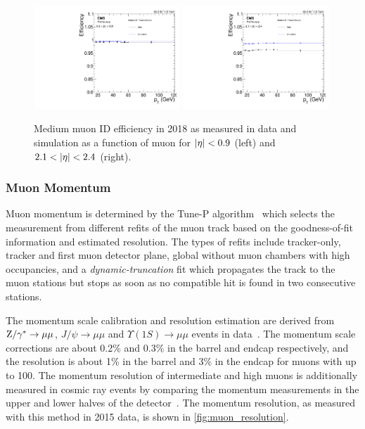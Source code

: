 \begin{figure}
    \includegraphics[width=0.49\textwidth]{Figures/Detector/CMS/muon_id_low_eta.pdf}
    \includegraphics[width=0.49\textwidth]{Figures/Detector/CMS/muon_id_high_eta.pdf}
    \caption[Medium Muon ID Efficiency in 2018]{Medium muon ID efficiency in 2018 as measured in data and simulation as a function of muon \pt for $\lvert \eta \rvert < 0.9$ (left) and $2.1 < \lvert \eta \rvert < 2.4$ (right).}\label{fig:muon_id_performance}
  \end{figure}

\subsubsection{Muon Momentum}

Muon momentum is determined by the Tune-P algorithm~\cite{CMS:2012nsv} which selects the \pt measurement from different refits of the muon track based on the goodness-of-fit information and estimated \pt resolution. The types of refits include tracker-only, tracker and first muon detector plane, global without muon chambers with high occupancies, and a \textit{dynamic-truncation} fit which propagates the track to the muon stations but stops as soon as no compatible hit is found in two consecutive stations.

The momentum scale calibration and resolution estimation are derived from $\mathrm{Z}/\gamma^*\to\mu\mu$, $J/\psi\to\mu\mu$ and $\Upsilon(1S)\to\mu\mu$ events in data~\cite{Bodek:2012id}. The momentum scale corrections are about 0.2\% and 0.3\% in the barrel and endcap respectively, and the resolution is about 1\% in the barrel and 3\% in the endcap for muons with \pt up to 100\GeV. The momentum resolution of intermediate and high \pt muons is additionally measured in cosmic ray events by comparing the momentum measurements in the upper and lower halves of the detector~\cite{CMS:2009fdy}. The momentum resolution, as measured with this method in 2015 data, is shown in \cref{fig:muon_resolution}. 

